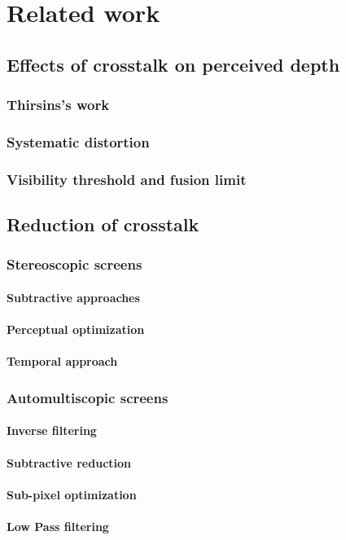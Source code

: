 \chapter{Related work}
\label{chap:relatedWork}

\section{Effects of crosstalk on perceived depth}

\subsection{Thirsins's work}

\subsection{Systematic distortion}

\subsection{Visibility threshold and fusion limit}

\section{Reduction of crosstalk}

\subsection{Stereoscopic screens}
\subsubsection{Subtractive approaches}
\subsubsection{Perceptual optimization}
\subsubsection{Temporal approach}

\subsection{Automultiscopic screens}
\subsubsection{Inverse filtering}
\subsubsection{Subtractive reduction}
\subsubsection{Sub-pixel optimization}
\subsubsection{Low Pass filtering}